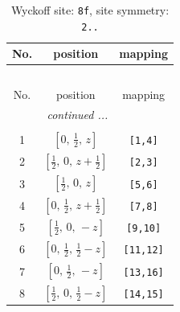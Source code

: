 \documentclass[fleqn,8pt]{jsarticle}
\begin{document}
\begin{longtable}{ccc}
\caption{Wyckoff site: {\tt 8f}, site symmetry: {\tt 2..}}
 \\
 \hline \hline
No. & position & mapping \\ \hline \endfirsthead

\multicolumn{2}{l}{\tablename\ \thetable{}} \\
 \hline \hline
No. & position & mapping \\ \hline \endhead

 \hline \hline
\multicolumn{2}{r}{\footnotesize\it continued ...} \\ \endfoot

 \hline \hline
\multicolumn{2}{r}{} \\ \endlastfoot

1 & $\left[ 0,\, \frac{1}{2},\, z \right]$ & {\tt [1,4]} \\ \hline
2 & $\left[ \frac{1}{2},\, 0,\, z + \frac{1}{2} \right]$ & {\tt [2,3]} \\ \hline
3 & $\left[ \frac{1}{2},\, 0,\, z \right]$ & {\tt [5,6]} \\ \hline
4 & $\left[ 0,\, \frac{1}{2},\, z + \frac{1}{2} \right]$ & {\tt [7,8]} \\ \hline
5 & $\left[ \frac{1}{2},\, 0,\, - z \right]$ & {\tt [9,10]} \\ \hline
6 & $\left[ 0,\, \frac{1}{2},\, \frac{1}{2} - z \right]$ & {\tt [11,12]} \\ \hline
7 & $\left[ 0,\, \frac{1}{2},\, - z \right]$ & {\tt [13,16]} \\ \hline
8 & $\left[ \frac{1}{2},\, 0,\, \frac{1}{2} - z \right]$ & {\tt [14,15]} \\
\end{longtable}
\renewcommand{\arraystretch}{1.2}
\end{document}
